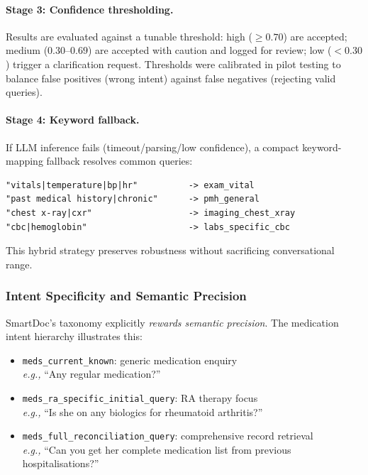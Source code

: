 \paragraph{Stage 3: Confidence thresholding.}
Results are evaluated against a tunable threshold: high ($\geq 0.70$) are
accepted; medium ($0.30$--$0.69$) are accepted with caution and logged for review;
low ($<0.30$) trigger a clarification request. Thresholds were calibrated in
pilot testing to balance false positives (wrong intent) against false negatives
(rejecting valid queries).

\paragraph{Stage 4: Keyword fallback.}
If LLM inference fails (timeout/parsing/low confidence), a compact
keyword-mapping fallback resolves common queries:

\begin{verbatim}
"vitals|temperature|bp|hr"          -> exam_vital
"past medical history|chronic"      -> pmh_general
"chest x-ray|cxr"                   -> imaging_chest_xray
"cbc|hemoglobin"                    -> labs_specific_cbc
\end{verbatim}

This hybrid strategy preserves robustness without sacrificing conversational range.

\subsubsection{Intent Specificity and Semantic Precision}

SmartDoc’s taxonomy explicitly \emph{rewards semantic precision}. The medication
intent hierarchy illustrates this:

\begin{itemize}
  \item \texttt{meds\_current\_known}: generic medication enquiry\\
  \emph{e.g.,} ``Any regular medication?''
  \item \texttt{meds\_ra\_specific\_initial\_query}: RA therapy focus\\
  \emph{e.g.,} ``Is she on any biologics for rheumatoid arthritis?''
  \item \texttt{meds\_full\_reconciliation\_query}: comprehensive record retrieval\\
  \emph{e.g.,} ``Can you get her complete medication list from previous hospitalisations?''
\end{itemize}


